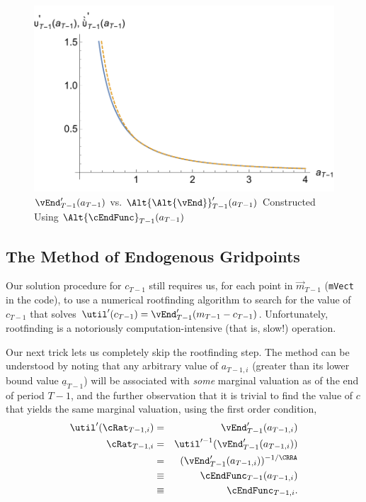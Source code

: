 \documentclass[titlepage]{\econtex}
\begin{document}
\hypertarget{GothVVSGothCInv}{}
\begin{figure}
  \includegraphics{./Figures/GothVVSGothCInv}
  \caption{$\vEnd_{T-1}^{\prime}({a}_{T-1})$ vs. $\Alt{\Alt{\vEnd}}_{T-1}^{\prime}({a}_{T-1})$ Constructed Using $\Alt{\cEndFunc}_{T-1}({a}_{T-1})$}
  \label{fig:GothVVSGothCInv}
\end{figure}



\hypertarget{The-Method-of-Endogenous-Gridpoints}{}
\subsection{The Method of Endogenous Gridpoints}

Our solution procedure for ${c}_{T-1}$ still requires us, for each
point in $\vec{m}_{T-1}$ (\texttt{mVect} in the code), to use a
numerical rootfinding algorithm to search for the value of ${c}_{T-1}$
that solves $\util^{\prime}({c}_{T-1}) =
\vEnd_{T-1}^{\prime}({m}_{T-1}-{c}_{T-1})$.  Unfortunately, rootfinding
is a notoriously computation-intensive (that is, slow!) operation.

Our next trick lets us completely skip the rootfinding step.  The method can be understood by noting that
any arbitrary value of ${a}_{T-1,i}$ (greater than its lower bound
value $\underline{a}_{T-1}$) will be associated with \textit{some}
marginal valuation as of the end of period $T-1$, and the further
observation that it is trivial to find the value of ${c}$ that yields
the same marginal valuation, using the first order condition,
\begin{eqnarray}
  \util^{\prime}({\cRat}_{T-1,i})  & =  &
                                          \vEnd^{\prime}_{T-1}({a}_{T-1,i}) \label{eq:eulerTm1}
  \\ {\cRat}_{T-1,i} & = & \util^{\prime-1}(\vEnd^{\prime}_{T-1}({a}_{T-1,i}))
  \\ & = & (\vEnd^{\prime}_{T-1}({a}_{T-1,i}))^{-1/\CRRA}
  \\ & \equiv & \cEndFunc_{T-1}({a}_{T-1,i})
  \\ & \equiv & \cEndFunc_{T-1,i}
                .
\end{eqnarray}
\end{document}
